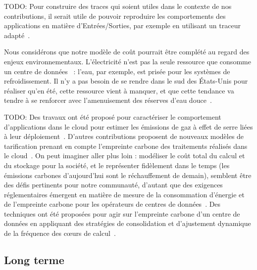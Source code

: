 TODO: Pour construire des traces qui soient utiles dans le contexte de nos contributions, il serait utile de pouvoir reproduire les comportements des applications en matière d'Entrées/Sorties, par exemple en utilisant un traceur adapté~\cite{naasEZIOTracerUnifyingKernel2021, ouarnoughiMultilevelTracerTiming}. 

Nous considérons que notre modèle de coût pourrait être complété au regard des enjeux environnementaux. L'électricité n'est pas la seule ressource que consomme un centre de données~\cite{rickeCountrylevelSocialCost2018} : l'eau, par exemple, est prisée pour les systèmes de refroidissement. Il n'y a pas besoin de se rendre dans le sud des États-Unis pour réaliser qu'en été, cette ressource vient à manquer, et que cette tendance va tendre à se renforcer avec l'amenuisement des réserves d'eau douce~\cite{EauAvecRessource2024}.

TODO: Des travaux ont été proposé pour caractériser le comportement d'applications dans le cloud pour estimer les émissions de gaz à effet de serre liées à leur déploiement~\cite{courageux-sudanStudyingEndendPerformancea}. D'autres contributions proposent de nouveaux modèles de tarification prenant en compte l'empreinte carbone des traitements réalisés dans le cloud~\cite{linBridgingSustainabilityGap2024}. On peut imaginer aller plus loin : modéliser le coût total du calcul et du stockage pour la société, et le représenter fidèlement dans le temps (les émissions carbones d'aujourd'hui sont le réchauffement de demain), semblent être des défis pertinents pour notre communauté, d'autant que des exigences réglementaires émergent en matière de mesure de la consommation d'énergie et de l'empreinte carbone pour les opérateurs de centres de données~\cite{davisUptimeInstituteGlobal2022}. Des techniques ont été proposées pour agir sur l'empreinte carbone d'un centre de données en appliquant des stratégies de consolidation et d'ajustement dynamique de la fréquence des cœurs de calcul~\cite{ostapencoModelingEvaluatingOrchestrating2023}.

\subsection{Long terme}

